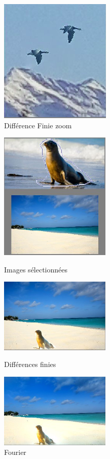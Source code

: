 \begin{figure}[!h]
\centering
\includegraphics[scale=0.5]{Images/Resultats/zoomOiseauDF.png}
\caption{Différence Finie zoom}
\end{figure}

\begin{figure}[!htb]
   \begin{minipage}{0.33\textwidth}
     \centering
     \includegraphics[width = 150pt]{Images/Resultats/otariePlage.png}
     \caption{Images sélectionnées}
      \end{minipage}\hfill
   \begin{minipage}{0.33\textwidth}
     \centering
     \includegraphics[width = 150pt]{Images/Resultats/OtariePlageD.png}
     \caption{Différences finies}
      \end{minipage}\hfill
   \begin{minipage}{0.33\textwidth}
     \centering
     \includegraphics[width= 150pt]{Images/Resultats/OtariePlageF.png}
     \caption{Fourier}
   \end{minipage}
\end{figure}
